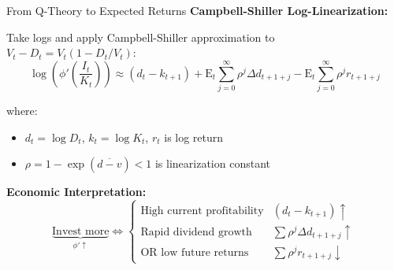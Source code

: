 \documentclass{beamer}
\begin{document}
\begin{frame}{From Q-Theory to Expected Returns}
    \textbf{Campbell-Shiller Log-Linearization:}
    
    Take logs and apply Campbell-Shiller approximation to $V_t - D_t = V_t(1 - D_t/V_t)$:
    \begin{equation}\label{equ:campbell shiller}
        \log\left(\phi'\left(\frac{I_t}{K_t}\right)\right) \approx (d_t - k_{t+1}) + \mathrm{E}_t \sum_{j=0}^{\infty} \rho^j \Delta d_{t+1+j} - \mathrm{E}_t \sum_{j=0}^{\infty} \rho^j r_{t+1+j}
    \end{equation}
    
    where:
    \begin{itemize}
        \item $d_t = \log D_t$, $k_t = \log K_t$, $r_t$ is log return
        \item $\rho = 1 - \exp(\overline{d - v}) < 1$ is linearization constant
    \end{itemize}
    
    
    \textbf{Economic Interpretation:}
    \begin{equation*}
        \underbrace{\text{Invest more}}_{\phi' \uparrow} \Leftrightarrow \begin{cases}
            \text{High current profitability} & (d_t - k_{t+1}) \uparrow \\
            \text{Rapid dividend growth} & \sum \rho^j \Delta d_{t+1+j} \uparrow \\
            \text{OR low future returns} & \sum \rho^j r_{t+1+j} \downarrow
        \end{cases}
    \end{equation*}
\end{frame}
\end{document}
